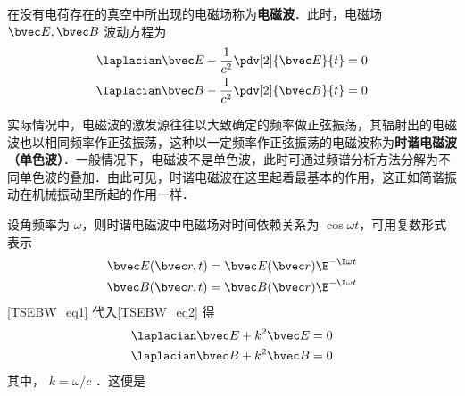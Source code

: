 在没有电荷存在的真空中所出现的电磁场称为\textbf{电磁波}．此时，电磁场 $\bvec E,\bvec B$ 波动方程为
\begin{equation}\label{TSEBW_eq2}
\begin{aligned}
\laplacian\bvec E-\frac{1}{c^2}\pdv[2]{\bvec E}{t}=0\\
\laplacian\bvec B-\frac{1}{c^2}\pdv[2]{\bvec B}{t}=0
\end{aligned}
\end{equation}

实际情况中，电磁波的激发源往往以大致确定的频率做正弦振荡，其辐射出的电磁波也以相同频率作正弦振荡，这种以一定频率作正弦振荡的电磁波称为\textbf{时谐电磁波（单色波）}．一般情况下，电磁波不是单色波，此时可通过频谱分析方法分解为不同单色波的叠加．由此可见，时谐电磁波在这里起着最基本的作用，这正如简谐振动在机械振动里所起的作用一样．

设角频率为 $\omega$，则时谐电磁波中电磁场对时间依赖关系为 $\cos\omega t$，可用复数形式表示
\begin{equation}\label{TSEBW_eq1}
\begin{aligned}
\bvec E(\bvec r,t)=\bvec E(\bvec r)\E^{-\I\omega t}\\
\bvec B(\bvec r,t)=\bvec B(\bvec r)\E^{-\I\omega t}
\end{aligned}
\end{equation}
\autoref{TSEBW_eq1} 代入\autoref{TSEBW_eq2} 得
\begin{equation}
\begin{aligned}
\laplacian\bvec E+k^2\bvec E=0\\
\laplacian\bvec B+k^2\bvec B=0
\end{aligned}
\end{equation}
其中， $k=\omega/c$ ．这便是